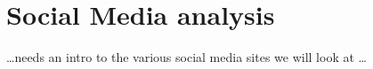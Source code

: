 \section{Social Media analysis}
\ldots needs an intro to the various social media sites we will look at \ldots